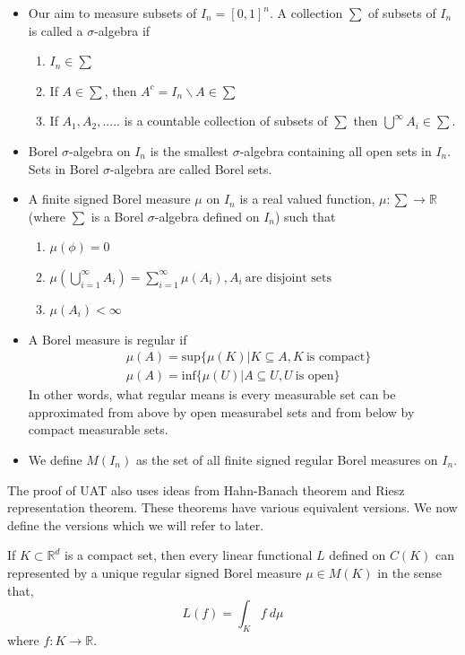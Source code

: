 \begin{itemize}
    \item Our aim to measure subsets of $I_n = [0,1]^n$. A collection $\sum$ of subsets of $I_n$ is called a 
    $\sigma$-algebra if 
    \begin{enumerate}
        \item $I_n \in \sum$
        \item If $A \in \sum$, then $A^c = I_n\backslash A \in \sum$
        \item If $A_1, A_2, .....$ is a countable collection of subsets of $\sum$ then $\bigcup^\infty A_i \in \sum$.
    \end{enumerate}
    \item Borel $\sigma$-algebra on $I_n$ is the smallest $\sigma$-algebra  containing all open sets in $I_n$. Sets in Borel $\sigma$-algebra 
    are called Borel sets.
    \item A finite signed Borel measure $\mu$ on $I_n$ is a real valued  function, $\mu : \sum \rightarrow \mathbb{R}$  (where
    $\sum$ is a Borel $\sigma$-algebra defined on $I_n$) such that 
    \begin{enumerate}
        \item $\mu (\phi) = 0$
        \item $\mu (\bigcup_{i=1}^{\infty} A_i) = \sum_{i=1}^{\infty} \mu(A_i), A_i \ \text{are disjoint sets}$
        \item $\mu(A_i) < \infty$
    \end{enumerate}
    \item A Borel measure is regular if 
    \begin{align*}
        &\mu(A) = \text{sup} \{\mu(K) | K \subseteq A, K \ \text{is compact}\} \\
        &\mu(A) = \text{inf} \{\mu(U) | A \subseteq U, U \ \text{is open}\}
    \end{align*}
    In other words, what regular means is every measurable set can be approximated from above by open measurabel 
    sets and from below by compact measurable sets. 
    \item We define $M(I_n)$ as the set of all finite signed regular Borel measures on $I_n$.
\end{itemize}
The proof of UAT also uses ideas from Hahn-Banach theorem and Riesz representation theorem. These theorems 
have various equivalent versions. We now define the versions which we will refer to later. 
\begin{thm}
    \label{thm:RR}
    If $K \subset \mathbb{R}^d$ is a compact set, then every linear functional $L$ defined on
    $C(K)$ can represented by a unique regular signed Borel measure $\mu \in M(K)$ in the sense that,
    $$L(f) = \int_K f \ d\mu$$
    where $f: K \rightarrow \mathbb{R}$.
\end{thm}
